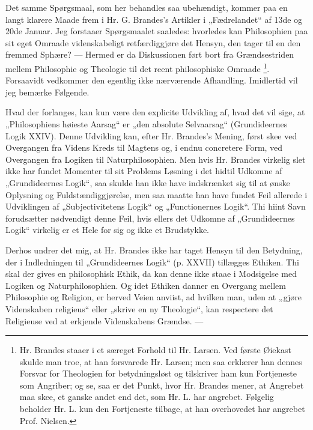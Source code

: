\documentclass[12pt,a4paper]{book}
\newcommand{\opage}[1]{\marginnote{\footnotesize\textit{[#1]}}}
\begin{document}
Det samme Spørgsmaal, som her behandles saa ubehændigt,
kommer paa en langt klarere Maade frem i Hr. G.
Brandes's Artikler i „Fædrelandet“ af 13de og 20de Januar.
Jeg forstaaer Spørgsmaalet saaledes: hvorledes kan Philosophien
paa sit eget Omraade videnskabeligt retfærdiggjøre det
Hensyn, den tager til en den fremmed Sphære? --- Hermed
er da Diskussionen ført bort fra Grændsestriden mellem Philosophie
og Theologie til det reent philosophiske Omraade%
\footnote{Hr. Brandes staaer i et særeget Forhold til Hr. Larsen. Ved første
Øiekast skulde man troe, at han forsvarede Hr. Larsen; men saa erklærer
han dennes Forsvar for Theologien for betydningsløst og
tilskriver ham kun Fortjeneste som Angriber; og se, saa er det Punkt,
hvor Hr. Brandes mener, at Angrebet maa skee, et ganske andet
end det, som Hr. L. har angrebet. Følgelig beholder Hr. L. kun
den Fortjeneste tilbage, at han overhovedet har angrebet Prof. Nielsen.}.
Forsaavidt vedkommer den egentlig ikke nærværende Afhandling.
Imidlertid vil jeg bemærke Følgende.

Hvad der forlanges, kan kun være den explicite Udvikling
af, hvad det vil sige, at „Philosophiens høieste Aarsag“ er
„den absolute Selvaarsag“ (Grundideernes Logik XXIV).
Denne Udvikling kan, efter Hr. Brandes's Mening, først skee
ved Overgangen fra Videns Kreds til Magtens og, i endnu
\opage{46}\setcounter{footnote}{0}%
concretere Form, ved Overgangen fra Logiken til Naturphilosophien.
Men hvis Hr. Brandes virkelig slet ikke har fundet
Momenter til sit Problems Løsning i det hidtil Udkomne af
„Grundideernes Logik“, saa skulde han ikke have indskrænket
sig til at ønske Oplysning og Fuldstændiggjørelse, men saa
maatte han have fundet Feil allerede i Udviklingen af „Subjectivitetens
Logik“ og „Functionernes Logik“. Thi hiint Savn
forudsætter nødvendigt denne Feil, hvis ellers det Udkomne af
„Grundideernes Logik“ virkelig er et Hele for sig og ikke et
Brudstykke.

Derhos undrer det mig, at Hr. Brandes ikke har taget
Hensyn til den Betydning, der i Indledningen til „Grundideernes
Logik“ (p. XXVII) tillægges Ethiken. Thi skal der
gives en philosophisk Ethik, da kan denne ikke staae i Modsigelse
med Logiken og Naturphilosophien. Og idet Ethiken
danner en Overgang mellem Philosophie og Religion, er herved
Veien anviist, ad hvilken man, uden at „gjøre Videnskaben
religieus“ eller „skrive en ny Theologie“, kan respectere det
Religieuse ved at erkjende Videnskabens Grændse. ---
\end{document}
